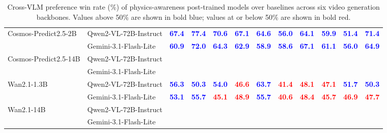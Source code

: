 \documentclass{article}
\begin{document}
\begin{table}[H]
{\begin{tabular}{llcccccccccc}
\multirow{2}{*}{Cosmos-Predict2.5-2B}
& Qwen2-VL-72B-Instruct
& \textbf{\textcolor{blue}{67.4}}
& \textbf{\textcolor{blue}{77.4}}
& \textbf{\textcolor{blue}{70.6}}
& \textbf{\textcolor{blue}{67.1}}
& \textbf{\textcolor{blue}{64.6}}
& \textbf{\textcolor{blue}{56.0}}
& \textbf{\textcolor{blue}{64.1}}
& \textbf{\textcolor{blue}{59.9}}
& \textbf{\textcolor{blue}{51.4}}
& \textbf{\textcolor{blue}{71.4}} \\
& Gemini-3.1-Flash-Lite
& \textbf{\textcolor{blue}{60.9}}
& \textbf{\textcolor{blue}{72.0}}
& \textbf{\textcolor{blue}{64.3}}
& \textbf{\textcolor{blue}{62.9}}
& \textbf{\textcolor{blue}{58.9}}
& \textbf{\textcolor{blue}{58.6}}
& \textbf{\textcolor{blue}{67.1}}
& \textbf{\textcolor{blue}{61.1}}
& \textbf{\textcolor{blue}{56.0}}
& \textbf{\textcolor{blue}{64.9}} \\
\midrule

\multirow{2}{*}{Cosmos-Predict2.5-14B}
& Qwen2-VL-72B-Instruct
& & & & & & & & & & \\
& Gemini-3.1-Flash-Lite
& & & & & & & & & & \\
\midrule

\multirow{2}{*}{Wan2.1-1.3B}
& Qwen2-VL-72B-Instruct
& \textbf{\textcolor{blue}{56.3}}
& \textbf{\textcolor{blue}{50.3}}
& \textbf{\textcolor{blue}{54.0}}
& \textbf{\textcolor{red}{46.6}}
& \textbf{\textcolor{blue}{63.7}}
& \textbf{\textcolor{red}{41.4}}
& \textbf{\textcolor{red}{48.1}}
& \textbf{\textcolor{red}{47.1}}
& \textbf{\textcolor{blue}{51.7}}
& \textbf{\textcolor{blue}{50.3}} \\
& Gemini-3.1-Flash-Lite
& \textbf{\textcolor{blue}{53.1}}
& \textbf{\textcolor{blue}{55.7}}
& \textbf{\textcolor{red}{45.1}}
& \textbf{\textcolor{red}{48.9}}
& \textbf{\textcolor{blue}{55.7}}
& \textbf{\textcolor{red}{40.6}}
& \textbf{\textcolor{red}{48.4}}
& \textbf{\textcolor{red}{45.7}}
& \textbf{\textcolor{red}{46.9}}
& \textbf{\textcolor{red}{47.7}} \\
\midrule

\multirow{2}{*}{Wan2.1-14B}
& Qwen2-VL-72B-Instruct
& & & & & & & & & & \\
& Gemini-3.1-Flash-Lite
& & & & & & & & & & \\
\bottomrule
\end{tabular}%
}
\caption{Cross-VLM preference win rate (\%) of physics-awareness post-trained models over baselines across six video generation backbones. Values above 50\% are shown in bold blue; values at or below 50\% are shown in bold red.}
\label{tab:human_vlm_physics_eval}
\end{table}
\FloatBarrier
\end{document}
